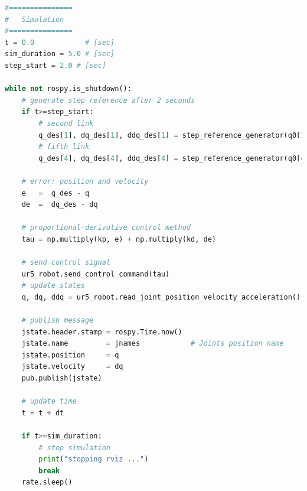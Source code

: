 \begin{lstlisting}[language=Python,caption={Rosnode to move the second and fifth joint of UR5 robot with the requirement motion of activity 1.3.}, label={lst:joint_PD_control}]
#===============
#   Simulation
#===============
t = 0.0            # [sec] 
sim_duration = 5.0 # [sec]
step_start = 2.0 # [sec]

while not rospy.is_shutdown():
    # generate step reference after 2 seconds
    if t>=step_start:
        # second link
        q_des[1], dq_des[1], ddq_des[1] = step_reference_generator(q0[1], -0.4)
        # fifth link
        q_des[4], dq_des[4], ddq_des[4] = step_reference_generator(q0[4], 0.5)

    # error: position and velocity
    e 	=  q_des - q
    de 	=  dq_des - dq    

    # proportional-derivative control method
    tau = np.multiply(kp, e) + np.multiply(kd, de)
    
    # send control signal
    ur5_robot.send_control_command(tau)
    # update states
    q, dq, ddq = ur5_robot.read_joint_position_velocity_acceleration()

    # publish message
    jstate.header.stamp = rospy.Time.now()
    jstate.name 		= jnames			# Joints position name
    jstate.position 	= q
    jstate.velocity 	= dq
    pub.publish(jstate)

    # update time
    t = t + dt

    if t>=sim_duration:
        # stop simulation
        print("stopping rviz ...")
        break
    rate.sleep()
\end{lstlisting}


